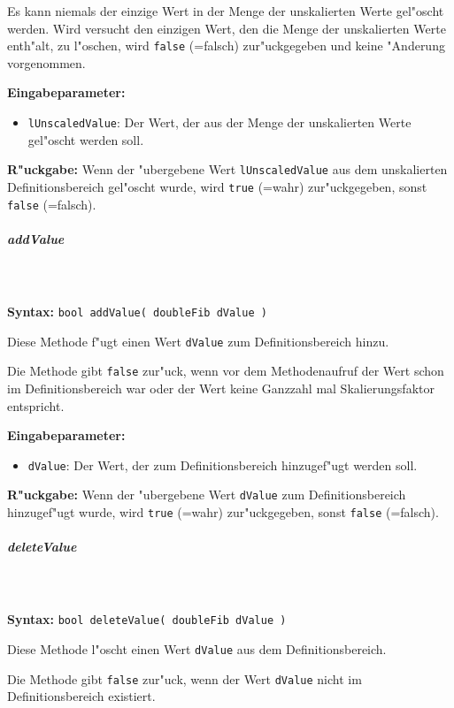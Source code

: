 Es kann niemals der einzige Wert in der Menge der unskalierten Werte gel"oscht werden. Wird versucht den einzigen Wert, den die Menge der unskalierten Werte enth"alt, zu l"oschen, wird \verb|false| (=falsch) zur"uckgegeben und keine "Anderung vorgenommen.

\bigskip\noindent
\textbf{Eingabeparameter:}
\begin{itemize}
 \item \verb|lUnscaledValue|: Der Wert, der aus der Menge der unskalierten Werte gel"oscht werden soll.
\end{itemize}

\bigskip\noindent
\textbf{R"uckgabe:}  Wenn der "ubergebene Wert \verb|lUnscaledValue| aus dem unskalierten Definitionsbereich gel"oscht wurde, wird \verb|true| (=wahr) zur"uckgegeben, sonst \verb|false| (=falsch).


\subparagraph{addValue}

\ \\\\\noindent
\textbf{Syntax:} \verb|bool addValue( doubleFib dValue )|

\bigskip\noindent
Diese Methode f"ugt einen Wert \verb|dValue| zum Definitionsbereich hinzu.

Die Methode gibt \verb|false| zur"uck, wenn vor dem Methodenaufruf der Wert schon im Definitionsbereich war oder der Wert keine Ganzzahl mal Skalierungsfaktor entspricht.

\bigskip\noindent
\textbf{Eingabeparameter:}
\begin{itemize}
 \item \verb|dValue|: Der Wert, der zum Definitionsbereich hinzugef"ugt werden soll.
\end{itemize}

\bigskip\noindent
\textbf{R"uckgabe:}  Wenn der "ubergebene Wert \verb|dValue| zum  Definitionsbereich hinzugef"ugt wurde, wird \verb|true| (=wahr) zur"uckgegeben, sonst \verb|false| (=falsch).


\subparagraph{deleteValue}

\ \\\\\noindent
\textbf{Syntax:} \verb|bool deleteValue( doubleFib dValue )|

\bigskip\noindent
Diese Methode l"oscht einen Wert \verb|dValue| aus dem Definitionsbereich.

Die Methode gibt \verb|false| zur"uck, wenn der Wert \verb|dValue| nicht im Definitionsbereich existiert.

